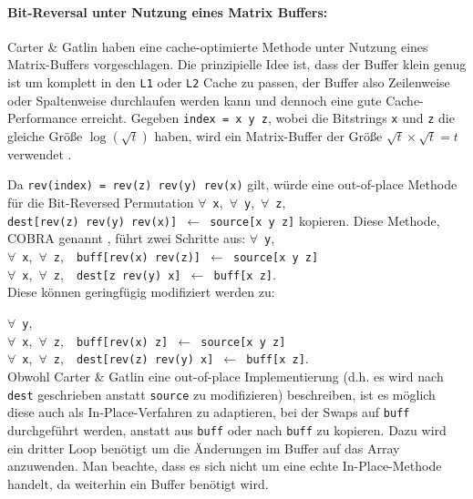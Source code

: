 \documentclass[10pt]{article}
\begin{document}
\paragraph{Bit-Reversal unter Nutzung eines Matrix Buffers:}
Carter \& Gatlin haben eine cache-optimierte Methode unter Nutzung eines Matrix-Buffers
vorgeschlagen. Die prinzipielle Idee ist, dass der Buffer klein genug ist um komplett in den 
{\tt L1} oder {\tt L2} Cache zu passen, der Buffer also Zeilenweise oder Spaltenweise durchlaufen 
werden kann und dennoch eine gute Cache-Performance erreicht. Gegeben {\tt index = x y z}, wobei die Bitstrings
{\tt x} und {\tt z} die gleiche Größe $\log(\sqrt{t})$ haben, wird ein Matrix-Buffer der Größe 
$\sqrt{t} \times \sqrt{t} = t$ verwendet \cite{carter:towards}.

Da {\tt rev(index) = rev(z) rev(y) rev(x)} gilt, würde eine out-of-place Methode für die Bit-Reversed Permutation
$\forall$~{\tt x},~$\forall$~{\tt y},~$\forall$~{\tt z},~{\tt
  dest[rev(z)~rev(y)~rev(x)]~$\gets$~source[x~y~z]} kopieren. 
Diese Methode, COBRA genannt \cite{carter:towards}, führt zwei Schritte aus: 
\noindent $\forall$~{\tt y},\\
\mbox{} \quad $\forall$~{\tt x},~$\forall$~{\tt z},~{\tt
  buff[rev(x)~rev(z)]~$\gets$~source[x~y~z]}\\
\mbox{} \quad $\forall$~{\tt x},~$\forall$~{\tt z},~{\tt
  dest[z~rev(y)~x]~$\gets$~buff[x~z]}.\\

\noindent Diese können geringfügig modifiziert werden zu:

\noindent $\forall$~{\tt y},\\
\mbox{} \quad $\forall$~{\tt x},~$\forall$~{\tt z},~{\tt
  buff[rev(x)~z]~$\gets$~source[x~y~z]}\\
\mbox{} \quad $\forall$~{\tt x},~$\forall$~{\tt z},~{\tt
  dest[rev(z)~rev(y)~x]~$\gets$~buff[x~z]}.\\

Obwohl Carter \& Gatlin eine out-of-place Implementierung (d.h. es wird nach {\tt dest} 
geschrieben anstatt {\tt source} zu modifizieren) beschreiben, ist es möglich
diese auch als In-Place-Verfahren zu adaptieren, bei der Swaps auf {\tt buff} 
durchgeführt werden, anstatt aus {\tt buff} oder nach {\tt buff} zu kopieren.  
Dazu wird ein dritter Loop benötigt um die Änderungen im Buffer auf das Array anzuwenden.
Man beachte, dass es sich nicht um eine echte In-Place-Methode handelt, da weiterhin 
ein Buffer benötigt wird. 
\end{document}
